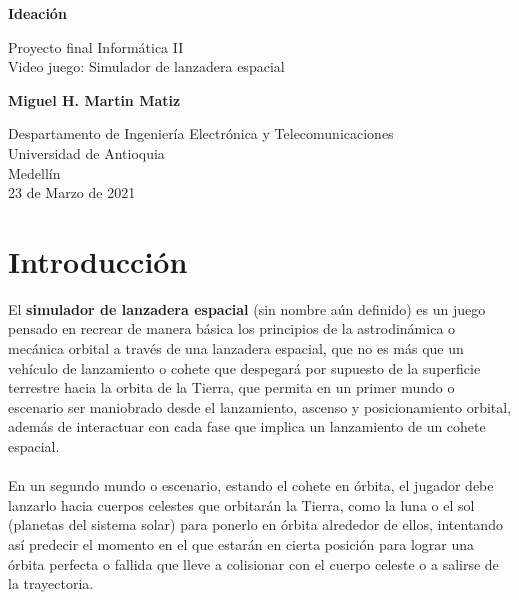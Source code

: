 \documentclass{article}
\begin{document}
\begin{titlepage}
    \begin{center}
        \vspace*{1cm}
            
        \Huge
        \textbf{Ideación}
            
        \vspace{0.5cm}
        \LARGE
        Proyecto final Informática II \\
        Video juego: Simulador de lanzadera espacial
            
        \vspace{1.5cm}
            
        \textbf{Miguel H. Martin Matiz}
            
        \vfill
            
        \vspace{0.8cm}
            
        \Large
        Despartamento de Ingeniería Electrónica y Telecomunicaciones\\
        Universidad de Antioquia\\
        Medellín\\
        23 de Marzo de 2021
            
    \end{center}
\end{titlepage}

\tableofcontents
\newpage
\section{Introducción}\label{intro}

El \textbf{simulador de lanzadera espacial} (sin nombre aún definido) es un juego pensado en recrear de manera básica los principios de la astrodinámica o mecánica orbital a través de una lanzadera espacial, que no es más que un vehículo de lanzamiento o cohete que despegará por supuesto de la superficie terrestre hacia la orbita de la Tierra, que permita en un primer mundo o escenario ser maniobrado desde el lanzamiento, ascenso y posicionamiento orbital, además de interactuar con cada fase que implica un lanzamiento de un cohete espacial.
\\\\
En un segundo mundo o escenario, estando el cohete en órbita, el jugador debe lanzarlo hacia cuerpos celestes que orbitarán la Tierra, como la luna o el sol (planetas del sistema solar) para ponerlo en órbita alrededor de ellos, intentando así predecir el momento en el que estarán en cierta posición para lograr una órbita perfecta o fallida que lleve a colisionar con el cuerpo celeste o a salirse de la trayectoria.
\\\\
\end{document}
